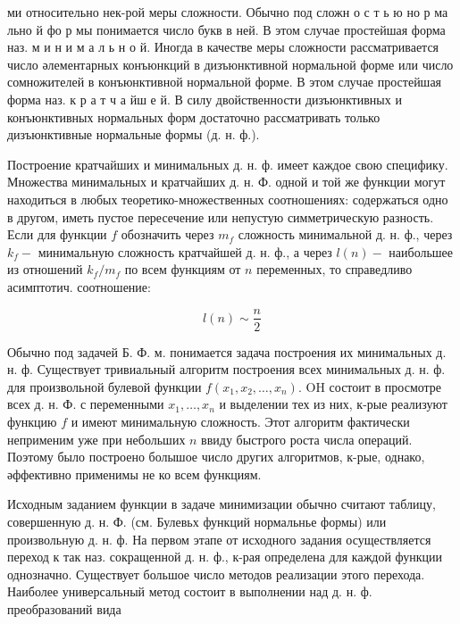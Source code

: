 \documentclass[10pt]{article}
\begin{document}
ми относительно нек-рой меры сложности. Обычно под сложн о с т ь ю но р ма льно й фо р мы понимается число букв в ней. В этом случае простейшая форма наз. м и н и м а л ь н о й. Иногда в качестве меры сложности рассматривается число әлементарных конъюнкций в дизъюнктивной нормальной форме или число сомножителей в конъюнктивной нормальной форме. В этом случае простейшая форма наз. к р а т ч а йш е й. В силу двойственности дизъюнктивных и конъюнктивных нормальных форм достаточно рассматривать только дизъюнктивные нормальные формы (д. н. ф.).



Построение кратчайших и минимальных д. н. ф. имеет каждое свою специфику. Множества минимальных и кратчайших д. н. Ф. одной и той же функции могут находиться в любых теоретико-множественных соотношениях: содержаться одно в другом, иметь пустое пересечение или непустую симметрическую разность. Если для функции $f$ обозначить через $m_{f}$ сложность минимальной д. н. ф., через $k_{f}-$ минимальную сложность кратчайшей д. н. ф., а через $l(n)-$ наибольшее из отношений $k_{f} / m_{f}$ по всем функциям от $n$ переменных, то справедливо асимптотич. соотношение:



\[

l(n) \sim \frac{n}{2}

\]



Обычно под задачей Б. Ф. м. понимается задача построения их минимальных д. н. ф. Существует тривиальный алгоритм построения всех минимальных д. н. ф. для произвольной булевой функции $f\left(x_{1}, x_{2}, \ldots, x_{n}\right)$. $\mathrm{OH}$ состоит в просмотре всех д. н. Ф. с переменными $x_{1}, \ldots, x_{n}$ и выделении тех из них, к-рые реализуют функцию $f$ и имеют минимальную сложность. Этот алгоритм фактически неприменим уже при небольших $n$ ввиду быстрого роста числа операций. Поэтому было построено болышое число других алгоритмов, к-рые, однако, әффективно применимы не ко всем функциям.



Исходным заданием функции в задаче минимизации обычно считают таблицу, совершенную д. н. Ф. (см. Булевьх функций нормальнье формы) или произвольную д. н. ф. На первом этапе от исходного задания осуществляется переход к так наз. сокращенной д. н. ф., к-рая определена для каждой функции однозначно. Существует большое число методов реализации этого перехода. Наиболее универсальный метод состоит в выполнении над д. н. ф. преобразований вида
\end{document}
